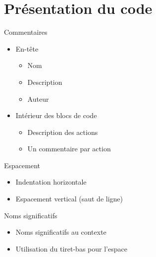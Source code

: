 \hypertarget{pruxe9sentation-du-code}{%
\section{Présentation du code}\label{pruxe9sentation-du-code}}

\begin{frame}{Commentaires}
\protect\hypertarget{commentaires}{}

\begin{itemize}
\tightlist
\item
  En-tête

  \begin{itemize}
  \tightlist
  \item
    Nom
  \item
    Description
  \item
    Auteur
  \end{itemize}
\item
  Intérieur des blocs de code

  \begin{itemize}
  \tightlist
  \item
    Description des actions
  \item
    Un commentaire par action
  \end{itemize}
\end{itemize}

\end{frame}

\begin{frame}{Espacement}
\protect\hypertarget{espacement}{}

\begin{itemize}
\tightlist
\item
  Indentation horizontale
\item
  Espacement vertical (saut de ligne)
\end{itemize}

\end{frame}

\begin{frame}{Noms significatifs}
\protect\hypertarget{noms-significatifs}{}

\begin{itemize}
\tightlist
\item
  Noms significatifs au contexte
\item
  Utilisation du tiret-bas pour l'espace
\end{itemize}

\end{frame}

